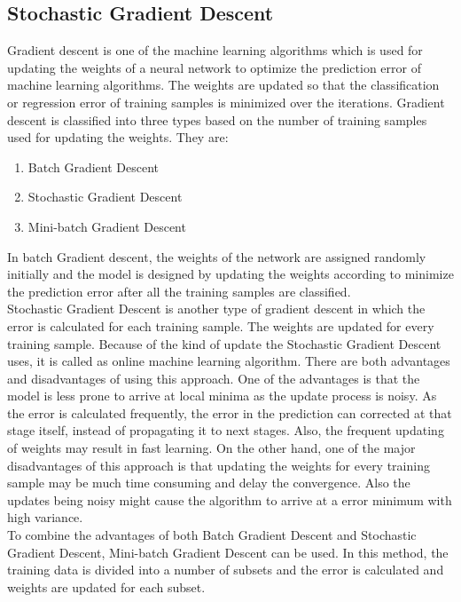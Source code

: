 \documentclass[sigconf]{acmart}
\begin{document}
\subsection{Stochastic Gradient Descent}
Gradient descent is one of the machine learning algorithms which is used for updating the weights of a neural network to optimize the prediction error of machine learning algorithms\cite{Brownlee2017}. The weights are updated so that the classification or regression error of training samples is minimized over the iterations. Gradient descent is classified into three types based on the number of training samples used for updating the weights. They are:
\begin{enumerate}
    \item Batch Gradient Descent
    \item Stochastic Gradient Descent
    \item Mini-batch Gradient Descent
\end{enumerate}
In batch Gradient descent, the weights of the network are assigned randomly initially and the model is designed by updating the weights according to minimize the prediction error after all the training samples are classified\cite{Brownlee2017}.  \\
Stochastic Gradient Descent is another type of gradient descent in which the error is calculated for each training sample. The weights are updated for every training sample. Because of the kind of update the Stochastic Gradient Descent uses, it is called as online machine learning algorithm. There are both advantages and disadvantages of using this approach. One of the advantages is that the model is less prone to arrive at local minima as the update process is noisy\cite{Brownlee2017}. As the error is calculated frequently, the error in the prediction can corrected at that stage itself, instead of propagating it to next stages. Also, the frequent updating of weights may result in fast learning. On the other hand, one of the major disadvantages of this approach is that updating the weights for every training sample may be much time consuming and delay the convergence. Also the updates being noisy might cause the algorithm to arrive at a error minimum with high variance\cite{Brownlee2017}.\\
To combine the advantages of both Batch Gradient Descent and Stochastic Gradient Descent, Mini-batch Gradient Descent can be used\cite{Brownlee2017}. In this method, the training data is divided into a number of subsets and the error is calculated and weights are updated for each subset. 
\end{document}
